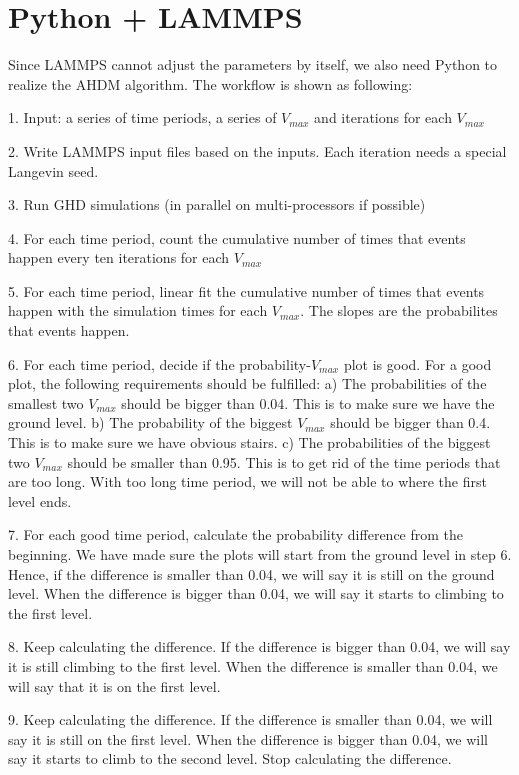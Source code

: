\documentclass{article}
\begin{document}
\section{Python + LAMMPS}

Since LAMMPS cannot adjust the parameters by itself, we also need Python to realize the AHDM algorithm. The workflow is shown as following:

1. Input: a series of time periods, a series of $V_{max}$ and iterations for each $V_{max}$

2. Write LAMMPS input files based on the inputs. Each iteration needs a special Langevin seed.

3. Run GHD simulations (in parallel on multi-processors if possible)

4. For each time period, count the cumulative number of times that events happen every ten iterations for each $V_{max}$

5. For each time period, linear fit the cumulative number of times that events happen with the simulation times for each $V_{max}$. The slopes are the probabilites that events happen.

6. For each time period, decide if the probability-$V_{max}$ plot is good. For a good plot, the following requirements should be fulfilled: a) The probabilities of the smallest two $V_{max}$ should be bigger than 0.04. This is to make sure we have the ground level. b) The probability of the biggest $V_{max}$ should be bigger than 0.4. This is to make sure we have obvious stairs. c) The probabilities of the biggest two $V_{max}$ should be smaller than 0.95. This is to get rid of the time periods that are too long. With too long time period, we will not be able to where the first level ends.

7. For each good time period, calculate the probability difference from the beginning. We have made sure the plots will start from the ground level in step 6. Hence, if the difference is smaller than 0.04, we will say it is still on the ground level. When the difference is bigger than 0.04, we will say it starts to climbing to the first level.

8. Keep calculating the difference. If the difference is bigger than 0.04, we will say it is still climbing to the first level. When the difference is smaller than 0.04, we will say that it is on the first level.

9. Keep calculating the difference. If the difference is smaller than 0.04, we will say it is still on the first level. When the difference is bigger than 0.04, we will say it starts to climb to the second level. Stop calculating the difference.
\end{document}
